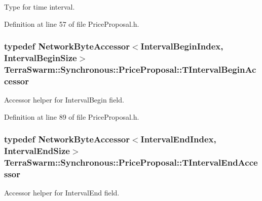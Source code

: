 Type for time interval. 



Definition at line 57 of file Price\-Proposal.\-h.

\hypertarget{class_terra_swarm_1_1_synchronous_1_1_price_proposal_a4a52f34f0b7c60bfc0ca8656cd9c3c5d}{
\subsubsection[{T\-Interval\-Begin\-Accessor}]{\setlength{\rightskip}{0pt plus 5cm}typedef {\bf Network\-Byte\-Accessor}$<${\bf Interval\-Begin\-Index}, {\bf Interval\-Begin\-Size}$>$ {\bf Terra\-Swarm\-::\-Synchronous\-::\-Price\-Proposal\-::\-T\-Interval\-Begin\-Accessor}\hspace{0.3cm}{\ttfamily [private]}}}\label{class_terra_swarm_1_1_synchronous_1_1_price_proposal_a4a52f34f0b7c60bfc0ca8656cd9c3c5d}


Accessor helper for Interval\-Begin field. 



Definition at line 89 of file Price\-Proposal.\-h.

\hypertarget{class_terra_swarm_1_1_synchronous_1_1_price_proposal_ad36cac35c047c96d50ecfb29504e9fd6}{
\subsubsection[{T\-Interval\-End\-Accessor}]{\setlength{\rightskip}{0pt plus 5cm}typedef {\bf Network\-Byte\-Accessor}$<${\bf Interval\-End\-Index}, {\bf Interval\-End\-Size}$>$ {\bf Terra\-Swarm\-::\-Synchronous\-::\-Price\-Proposal\-::\-T\-Interval\-End\-Accessor}\hspace{0.3cm}{\ttfamily [private]}}}\label{class_terra_swarm_1_1_synchronous_1_1_price_proposal_ad36cac35c047c96d50ecfb29504e9fd6}


Accessor helper for Interval\-End field. 



